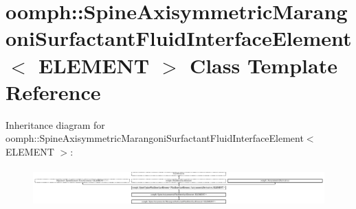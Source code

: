 \hypertarget{classoomph_1_1SpineAxisymmetricMarangoniSurfactantFluidInterfaceElement}{}\section{oomph\+:\+:Spine\+Axisymmetric\+Marangoni\+Surfactant\+Fluid\+Interface\+Element$<$ E\+L\+E\+M\+E\+NT $>$ Class Template Reference}
\label{classoomph_1_1SpineAxisymmetricMarangoniSurfactantFluidInterfaceElement}
Inheritance diagram for oomph\+:\+:Spine\+Axisymmetric\+Marangoni\+Surfactant\+Fluid\+Interface\+Element$<$ E\+L\+E\+M\+E\+NT $>$\+:\begin{figure}[H]
\begin{center}
\leavevmode
\includegraphics[height=1.515152cm]{classoomph_1_1SpineAxisymmetricMarangoniSurfactantFluidInterfaceElement}
\end{center}
\end{figure}
